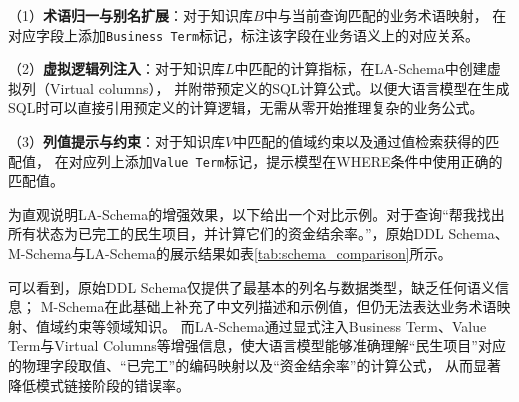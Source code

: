 （1）\textbf{术语归一与别名扩展}：对于知识库$B$中与当前查询匹配的业务术语映射，
在对应字段上添加\texttt{Business Term}标记，标注该字段在业务语义上的对应关系。

（2）\textbf{虚拟逻辑列注入}：对于知识库$L$中匹配的计算指标，在LA-Schema中创建虚拟列（Virtual columns），
并附带预定义的SQL计算公式。以便大语言模型在生成SQL时可以直接引用预定义的计算逻辑，无需从零开始推理复杂的业务公式。

（3）\textbf{列值提示与约束}：对于知识库$V$中匹配的值域约束以及通过值检索获得的匹配值，
在对应列上添加\texttt{Value Term}标记，提示模型在WHERE条件中使用正确的匹配值。

为直观说明LA-Schema的增强效果，以下给出一个对比示例。对于查询“帮我找出所有状态为已完工的民生项目，并计算它们的资金结余率。”，原始DDL Schema、M-Schema与LA-Schema的展示结果如表\ref{tab:schema_comparison}所示。

可以看到，原始DDL Schema仅提供了最基本的列名与数据类型，缺乏任何语义信息；
M-Schema在此基础上补充了中文列描述和示例值，但仍无法表达业务术语映射、值域约束等领域知识。
而LA-Schema通过显式注入Business Term、Value Term与Virtual Columns等增强信息，使大语言模型能够准确理解“民生项目”对应的物理字段取值、“已完工”的编码映射以及“资金结余率”的计算公式，
从而显著降低模式链接阶段的错误率。

